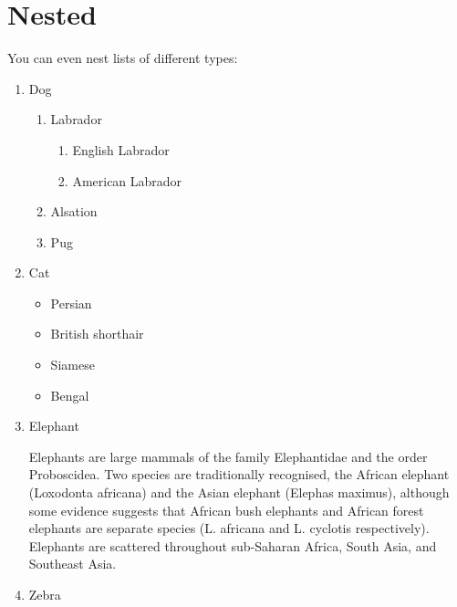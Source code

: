 \documentclass[a4paper,12pt]{article}
\begin{document}
\section{Nested}
You can even nest lists of different types:
\begin{enumerate}
  \item Dog
    \begin{enumerate}
      \item Labrador
        \begin{enumerate}
          \item English Labrador
          \item American Labrador
        \end{enumerate}
      \item Alsation
      \item Pug
    \end{enumerate}
  \item Cat
    \begin{itemize}
      \item Persian
      \item British shorthair
      \item Siamese
      \item Bengal
    \end{itemize}
  \item Elephant

    Elephants are large mammals of the family Elephantidae and the order Proboscidea. Two species are traditionally recognised, the African elephant (Loxodonta africana) and the Asian elephant (Elephas maximus), although some evidence suggests that African bush elephants and African forest elephants are separate species (L. africana and L. cyclotis respectively). Elephants are scattered throughout sub-Saharan Africa, South Asia, and Southeast Asia.
  \item Zebra
\end{enumerate}
\end{document}
